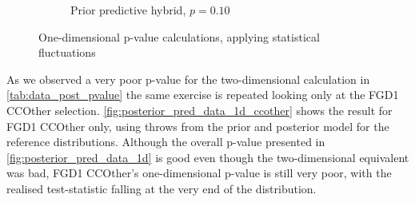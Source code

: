 \begin{figure}[h]
\begin{subfigure}[t]{0.49\textwidth}
		\caption{Prior predictive hybrid, $p=0.10$}
	\end{subfigure}
	\caption{One-dimensional p-value calculations, applying statistical fluctuations}
	\label{fig:posterior_pred_data_1d}
\end{figure}

As we observed a very poor p-value for the two-dimensional calculation in \autoref{tab:data_post_pvalue} the same exercise is repeated looking only at the FGD1 CCOther selection. \autoref{fig:posterior_pred_data_1d_ccother} shows the result for FGD1 CCOther only, using throws from the prior and posterior model for the reference distributions. Although the overall p-value presented in \autoref{fig:posterior_pred_data_1d} is good even though the two-dimensional equivalent was bad, FGD1 CCOther's one-dimensional p-value is still very poor, with the realised test-statistic falling at the very end of the distribution.

